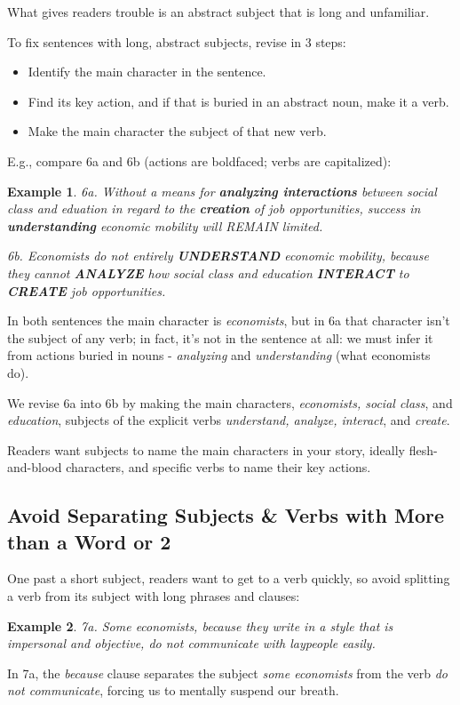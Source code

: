\documentclass[oneside]{book}
\numberwithin{equation}{section}
\newtheorem{example}{Example}[section]
\begin{document}
What gives readers trouble is an abstract subject that is long and unfamiliar.

%
To fix sentences with long, abstract subjects, revise in 3 steps:
\begin{itemize}
    \item Identify the main character in the sentence.
    \item Find its key action, and if that is buried in an abstract noun, make it a verb.
    \item Make the main character the subject of that new verb.
\end{itemize}
E.g., compare 6a and 6b (actions are boldfaced; verbs are capitalized):
\begin{example}
    6a. Without a means for \textbf{analyzing interactions} between social class and eduation in regard to the \textbf{creation} of job opportunities, success in \textbf{understanding} economic mobility will REMAIN limited.
    
    6b. Economists do not entirely \textbf{UNDERSTAND} economic mobility, because they cannot \textbf{ANALYZE} how social class and education \textbf{INTERACT} to \textbf{CREATE} job opportunities.
\end{example}
In both sentences the main character is \textit{economists}, but in 6a that character isn't the subject of any verb; in fact, it's not in the sentence at all: we must infer it from actions buried in nouns - \textit{analyzing} and \textit{understanding} (what economists do).

We revise 6a into 6b by making the main characters, \textit{economists, social class}, and \textit{education}, subjects of the explicit verbs \textit{understand, analyze, interact}, and \textit{create}.

%
Readers want subjects to name the main characters in your story, ideally flesh-and-blood characters, and specific verbs to name their key actions.

\subsection{Avoid Separating Subjects \& Verbs with More than a Word or 2}
One past a short subject, readers want to get to a verb quickly, so avoid splitting a verb from its subject with long phrases and clauses:
\begin{example}
    7a. Some economists, because they write in a style that is impersonal and objective, do not communicate with laypeople easily.
\end{example}
In 7a, the \textit{because} clause separates the subject \textit{some economists} from the verb \textit{do not communicate}, forcing us to mentally suspend our breath.
\end{document}
